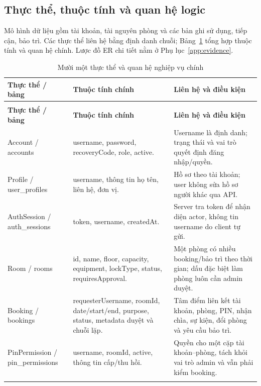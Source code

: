 \subsection{Thực thể, thuộc tính và quan hệ logic}
Mô hình dữ liệu gồm tài khoản, tài nguyên phòng và các bản ghi sử dụng, tiếp cận, bảo trì. Các thực thể liên hệ bằng định danh chuỗi; Bảng~\ref{tab:data} tổng hợp thuộc tính và quan hệ chính. Lược đồ ER chi tiết nằm ở Phụ lục~\ref{app:evidence}.
{\tabletext\renewcommand{\arraystretch}{1.04}\begin{longtable}{>{\raggedright\arraybackslash}p{}>{\raggedright\arraybackslash}p{}>{\raggedright\arraybackslash}p{}}
\caption{Mười một thực thể và quan hệ nghiệp vụ chính}\label{tab:data}\\
\toprule \textbf{Thực thể / bảng} & \textbf{Thuộc tính chính} & \textbf{Liên hệ và điều kiện}\\\midrule
\endfirsthead
\multicolumn{3}{l}{\small Mười một thực thể và quan hệ nghiệp vụ chính (tiếp)}\\
\toprule \textbf{Thực thể / bảng} & \textbf{Thuộc tính chính} & \textbf{Liên hệ và điều kiện}\\\midrule
\endhead
\bottomrule\endlastfoot
Account / accounts & username, password, recoveryCode, role, active. & Username là định danh; trạng thái và vai trò quyết định đăng nhập/quyền.\\\addlinespace[1.5pt]
Profile / user\_profiles & username, thông tin họ tên, liên hệ, đơn vị. & Hồ sơ theo tài khoản; user không sửa hồ sơ người khác qua API.\\\addlinespace[1.5pt]
AuthSession / auth\_sessions & token, username, createdAt. & Server tra token để nhận diện actor, không tin username do client tự gửi.\\\addlinespace[1.5pt]
Room / rooms & id, name, floor, capacity, equipment, lockType, status, requiresApproval. & Một phòng có nhiều booking/bảo trì theo thời gian; dấu đặc biệt làm phòng luôn cần admin duyệt.\\\addlinespace[1.5pt]
Booking / bookings & requesterUsername, roomId, date/start/end, purpose, status, metadata duyệt và chuỗi lặp. & Tâm điểm liên kết tài khoản, phòng, PIN, nhận chìa, sự kiện, đổi phòng và yêu cầu bảo trì.\\\addlinespace[1.5pt]
PinPermission / pin\_permissions & username, roomId, active, thông tin cấp/thu hồi. & Quyền cho một cặp tài khoản--phòng, tách khỏi vai trò admin và vẫn phải kiểm booking.\\\addlinespace[1.5pt]

\end{longtable}}
